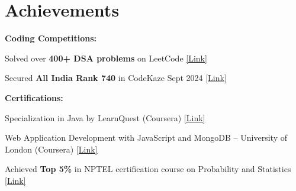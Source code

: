 \documentclass[letterpaper,10pt]{article}
\begin{document}
\section{Achievements}
\textbf{Coding Competitions:}
\begin{itemize}[leftmargin=0.15in, itemsep=0pt]
    \small{
    \item Solved over \textbf{400+ DSA problems} on LeetCode \href{https://leetcode.com/u/Astha9900/}{[Link]}
    \item Secured \textbf{All India Rank 740} in CodeKaze Sept 2024 \href{https://drive.google.com/file/d/1hA3l3e1gyLbuW0x48-6epIuosppxmrcC/view?usp=sharing}{[Link]}
    }
\end{itemize}
\vspace{2pt}
\textbf{Certifications:}
\begin{itemize}[leftmargin=0.15in, itemsep=0pt]
    \small{
    \item Specialization in Java by LearnQuest (Coursera) \href{https://www.coursera.org/account/accomplishments/specialization/CA8Z6REJ8VV2}{[Link]}
    \item Web Application Development with JavaScript and MongoDB -- University of London (Coursera) \href{https://www.coursera.org/account/accomplishments/verify/TXJAWWZ8KTMP}{[Link]}
    \item Achieved \textbf{Top 5\%} in NPTEL certification course on Probability and Statistics \href{https://drive.google.com/file/d/12bYUgCIoV8Mr-lmuEXsTQcaxfSbKRllf/view?usp=sharing}{[Link]}
    }
\end{itemize}
\end{document}
